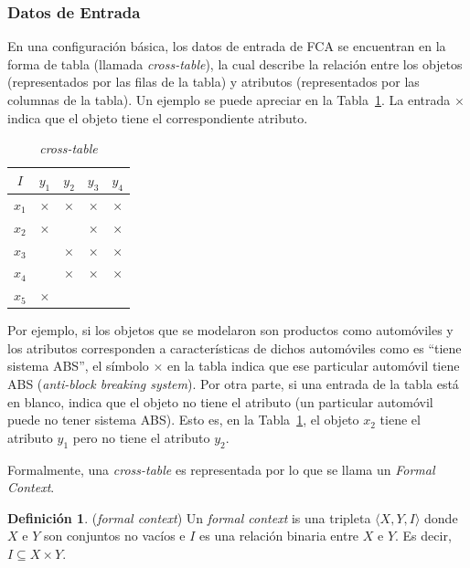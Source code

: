 \documentclass[12pt,oneside,letterpaper]{book}
\newcommand{\eng}[1]{\textit{#1}\xspace}			%
\newcommand{\abr}[1]{\textsc{#1}\xspace}           %
\theoremstyle{definition}
\newtheorem{definition}{Definición}[section]
\begin{document}
\subsubsection{Datos de Entrada}
\label{ssub:datos_de_entrada}
En una configuración básica, los datos de entrada de \abr{FCA} se encuentran en la forma de tabla (llamada \eng{cross-table}), la cual describe la relación entre los objetos (representados por las filas de la tabla) y atributos (representados por las columnas de la tabla). Un ejemplo se puede apreciar en la Tabla~\ref{tbl:cross_table}. La entrada $\times$ indica que el objeto tiene el correspondiente atributo.

\begin{table}[h!]
	\centering
	\begin{tabular}{|c|cccc|}
		\hline
		$I$		& $y_1$		& $y_2$ 	& $y_3$ 	& $y_4$ 	\\ \hline
		$x_1$	& $\times$	& $\times$	& $\times$ 	& $\times$ 	\\
		$x_2$	& $\times$	& 			& $\times$ 	& $\times$ 	\\
		$x_3$	& 			& $\times$	& $\times$ 	& $\times$ 	\\
		$x_4$	& 			& $\times$	& $\times$ 	& $\times$ 	\\
		$x_5$	& $\times$	& 			& 		 	& 		 	\\
		\hline
	\end{tabular}
	\caption{\eng{cross-table}}
	\label{tbl:cross_table}
\end{table}

\newpage
Por ejemplo, si los objetos que se modelaron son productos como automóviles y los atributos corresponden a características de dichos automóviles como es ``tiene sistema \abr{ABS}'', el símbolo $\times$ en la tabla indica que ese particular automóvil tiene \abr{ABS} (\eng{anti-block breaking system}). Por otra parte, si una entrada de la tabla está en blanco, indica que el objeto no tiene el atributo (un particular automóvil puede no tener sistema \abr{ABS}). Esto es, en la Tabla~\ref{tbl:cross_table}, el objeto $x_2$ tiene el atributo $y_1$ pero no tiene el atributo $y_2$.

Formalmente, una \eng{cross-table} es representada por lo que se llama un \eng{Formal Context}.

\theoremstyle{definition}
\begin{definition}{(\eng{formal context})}
Un \eng{formal context} is una tripleta $\langle X,Y,I \rangle$ donde $X$ e $Y$ son conjuntos no vacíos e $I$ es una relación binaria entre $X$ e $Y$. Es decir, $I \subseteq X \times Y$.
\end{definition}
\end{document}
